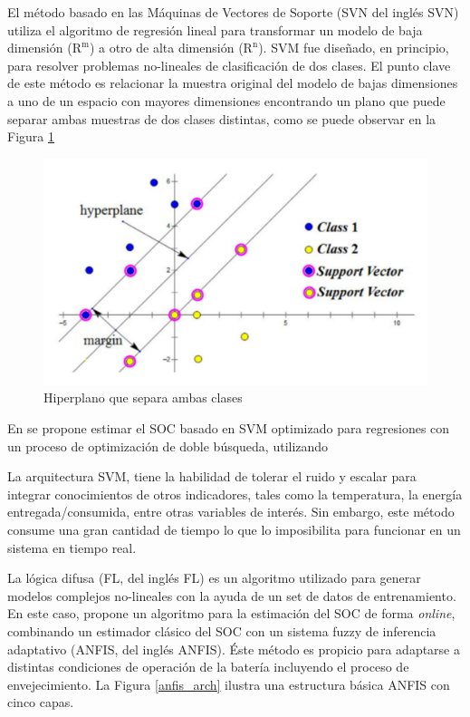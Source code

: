 \documentclass[10pt,a4paper]{article}
\newcounter{subsubsubsection}[subsubsection]
\begin{document}
\newpage


\noindent El m\'etodo basado en las M\'aquinas de Vectores de Soporte 
(\acrshort{SVN} del ingl\'es \acrlong{SVN}) utiliza el algoritmo de regresi\'on 
lineal para transformar un modelo de baja dimensi\'on ($\mathrm{R^m}$) a otro de 
alta dimensi\'on ($\mathrm{R^n}$). \acrshort{SVM} fue diseñado, en principio, 
para  resolver problemas no-lineales de clasificaci\'on de dos clases. El punto 
clave de este m\'etodo es relacionar la muestra original del modelo de bajas 
dimensiones a uno de un espacio con mayores dimensiones encontrando un plano que 
puede separar ambas muestras de dos clases distintas, como se puede observar en 
la Figura \ref{svn_graph}

\begin{figure}[h!]
    \begin{center}
        \includegraphics[width=.7\textwidth]{svm_graphic.png}
        \caption{Hiperplano que separa ambas clases}
        \label{svn_graph}
    \end{center}
\end{figure}

\noindent En \cite{HU2014682} se propone estimar el \acrshort{SOC} basado en 
\acrshort{SVM} optimizado para regresiones con un proceso de optimizaci\'on de 
doble b\'usqueda, utilizando

\noindent La arquitectura \acrshort{SVM}, tiene la habilidad de tolerar el ruido 
y escalar para integrar conocimientos de otros indicadores, tales como la 
temperatura, la energ\'ia entregada/consumida, entre otras variables de 
inter\'es. Sin embargo, este m\'etodo consume una gran cantidad de tiempo lo que 
lo imposibilita para funcionar en un sistema en tiempo real.


\noindent La l\'ogica difusa (\acrshort{FL}, del ingl\'es \acrlong{FL}) es un
algoritmo utilizado para generar modelos complejos no-lineales con la ayuda de
un set de datos de entrenamiento. En este caso, \cite{DAI2015350} propone un 
algoritmo para la estimaci\'on del \acrshort{SOC} de forma \emph{online},
combinando un estimador cl\'asico del \acrshort{SOC} con un sistema fuzzy de
inferencia adaptativo (\acrshort{ANFIS}, del ingl\'es \acrlong{ANFIS}). \'Este
m\'etodo es propicio para adaptarse a distintas condiciones de operaci\'on de la
bater\'ia incluyendo el proceso de envejecimiento. La Figura \ref{anfis_arch}
ilustra una estructura b\'asica \acrshort{ANFIS} con cinco capas.
\end{document}
